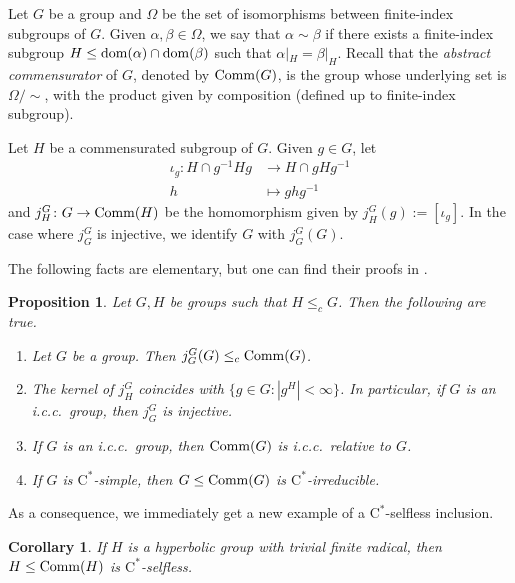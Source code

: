 \documentclass[11pt]{article}
\newtheorem{cor}[thm]{Corollary}
\newtheorem{prop}[thm]{Proposition}
\theoremstyle{definition}
\theoremstyle{remark}
\numberwithin{equation}{section}
\numberwithin{equation}{section}
\newcommand{\Cs}{\ensuremath{\mathrm{C}^\ast}}
\numberwithin{equation}{section}
\begin{document}
 Let $ G $ be a group and $\Omega$ be the set of isomorphisms between finite-index subgroups of $ G $. Given $\alpha, \beta\in\Omega$,  we say that $\alpha\sim\beta$ if there exists a finite-index subgroup $H\leq {\rm dom}(\alpha)\cap{\rm dom}(\beta)$ such that $\alpha|_H=\beta|_H$.  Recall that the \emph{abstract commensurator} of $ G $, denoted by ${\rm Comm}( G )$, is the group whose underlying set is $\Omega/{\sim}$, with the product given by composition (defined up to finite-index subgroup).  

Let $ H $ be a commensurated subgroup of $ G $. Given $g\in G $, let 
\begin{align*}
\iota_g\colon  H \cap g^{-1} H  g&\to  H \cap g H  g^{-1}\\
h&\mapsto ghg^{-1}
\end{align*}
and $j_ H ^G\colon G\to{\rm Comm}( H )$ be the homomorphism given by $j^G_ H (g):=[\iota_g]$. In the case where $j_G^G$ is injective, we identify $G$ with $j_G^G(G)$.

The following facts are elementary, but one can find their proofs in \cite{LiSc23}.

\begin{prop}\label{known}
    Let $G,H$ be groups such that $ H \leq_cG$. Then the following are true.
    \begin{enumerate}
        \item Let $G$ be a group. Then $j_G^G(G)\leq_c{\rm Comm}(G)$. 
        \item The kernel of $j^G_H$ coincides with $\{g\in G:|g^ H |<\infty\}$. In particular, if $G$ is an i.c.c.\ group, then $j_G^G$ is injective.
        \item If $G$ is an i.c.c.\ group, then ${\rm Comm}(G)$ is i.c.c.\ relative to $G$.
        \item If $G$ is \Cs-simple, then $G\leq{\rm Comm}(G)$ is \Cs-irreducible.
    \end{enumerate}
\end{prop}


As a consequence, we immediately get a new example of a \Cs-selfless inclusion.

\begin{cor}
    If $H$ is a hyperbolic group with trivial finite radical, then $H\leq{\rm Comm}(H)$ is \Cs-selfless.
\end{cor}








\end{document}
